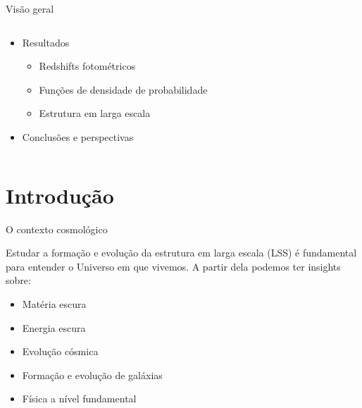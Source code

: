 \begin{frame}[c]{Visão geral}
\begin{columns}[c]
\begin{column}{0.48\linewidth}
\begin{splusbox}{}
\begin{itemize}
\begin{itemize}
                    \end{itemize}
                    \item Resultados
                    \begin{itemize}
                        \item Redshifts fotométricos
                        \item Funções de densidade de probabilidade
                        \item Estrutura em larga escala
                    \end{itemize}
                    \item Conclusões e perspectivas
                \end{itemize}
            \end{splusbox}
        \end{column}
    \end{columns}

 \end{frame}

\section{Introdução}
\begin{frame}[c]{O contexto cosmológico}
    \begin{splusbox}{}
        Estudar a formação e evolução da estrutura em larga escala (LSS) é fundamental para entender o Universo em que vivemos. A partir dela podemos ter insights sobre:
        \begin{itemize}
            \item Matéria escura
            \item Energia escura
            \item Evolução cósmica
            \item Formação e evolução de galáxias
            \item Física a nível fundamental
        \end{itemize}
    \end{splusbox}
\end{frame}




